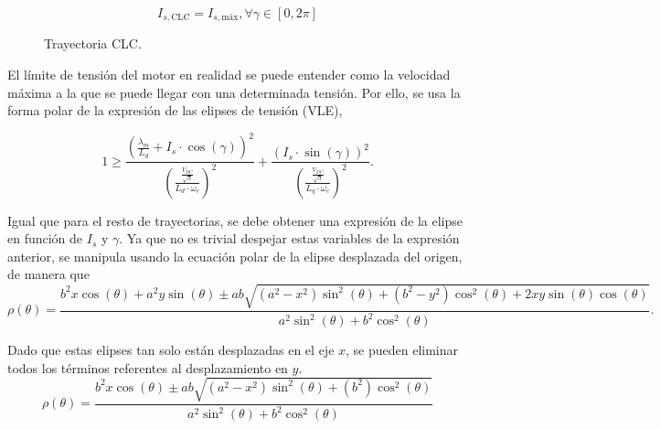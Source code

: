 \[
I_{s,\text{CLC}} = I_{s,\text{máx}} , \forall \gamma \in [0,2\pi]
\]


\begin{figure}[H]
  \centering
  \caption{Trayectoria CLC.}
\end{figure}


El límite de tensión del motor en realidad se puede entender como la velocidad máxima a la que se puede llegar con una determinada tensión. Por ello, se usa la forma polar de la expresión de las elipses de tensión (VLE),

\begin{equation}
1 \geq \frac{\left(\frac{\lambda_m}{L_d}+I_s \cdot \cos(\gamma)\right)^2}{\left(\frac{\frac{V_{DC}}{\sqrt{3}}}{L_d\cdot\omega_e}\right)^2}+\frac{(I_s \cdot \sin(\gamma))^2}{\left(\frac{\frac{V_{DC}}{\sqrt{3}}}{L_q\cdot\omega_e}\right)^2} \text{.}
\end{equation}

Igual que para el resto de trayectorias, se debe obtener una expresión de la elipse en función de $I_s$ y $\gamma$. Ya que no es trivial despejar estas variables de la expresión anterior, se manipula usando la ecuación polar de la elipse desplazada del origen, de manera que
\begin{equation}
\rho(\theta) = \frac{b^2 x \cos (\theta ) + a^2 y \sin (\theta )\pm a b \sqrt{\left(a^2-x^2\right) \sin ^2(\theta )+\left(b^2-y^2\right) \cos ^2(\theta )+2 x y \sin (\theta ) \cos (\theta )}}{a^2 \sin ^2(\theta )+b^2 \cos ^2(\theta )} \text{.}
\end{equation}

Dado que estas elipses tan solo están desplazadas en el eje $x$, se pueden eliminar todos los términos referentes al desplazamiento en $y$.
\begin{equation}
\rho(\theta) = \frac{b^2 x \cos (\theta ) \pm a b \sqrt{\left(a^2-x^2\right) \sin ^2(\theta )+\left(b^2\right) \cos ^2(\theta )}}{a^2 \sin ^2(\theta )+b^2 \cos ^2(\theta )}
\end{equation}

